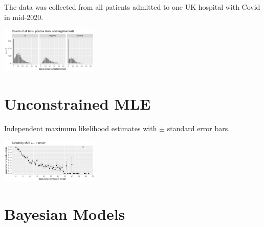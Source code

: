 \documentclass[plainboxedsections, 25pt]{sciposter}
\begin{document}
\begin{multicols}{2}
The data was collected from all patients admitted to one UK hospital with
Covid in mid-2020.

\begin{center}
\includegraphics[width=0.35\textwidth]{img/data-counts.pdf}
\end{center}

\section{Unconstrained MLE}

Independent maximum likelihood estimates with $\pm$ standard error
bars.

\begin{center}
\includegraphics[width=0.35\textwidth]{img/mle.pdf}
\end{center}


\section{Bayesian Models}
\newcommand{\ilogit}{\textrm{logit}^{-1}}


\end{multicols}
\end{document}
